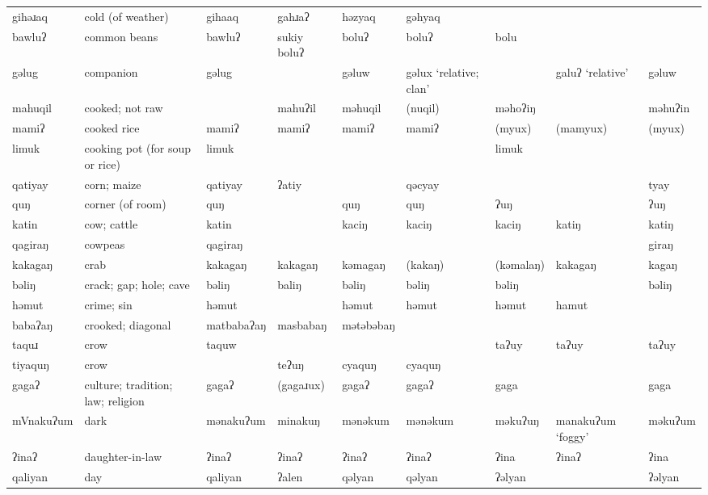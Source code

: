 \begin{landscape}
\begin{longtable}{*{9}{>{\raggedright\arraybackslash}p{}}}
\text{*}gihəɹaq      & cold (of weather) & gihaaq & gahɹaʔ & həzyaq & gəhyaq &  &  & \\
\text{*}bawluʔ       & common beans & bawluʔ & sukiy boluʔ & boluʔ & boluʔ & bolu &  & \\
\text{*}gəlug        & companion & gəlug &  & gəluw & gəlux `relative; clan' &  & galuʔ \newline `relative' & gəluw\\
\text{*}mahuqil      & cooked; not raw &  & mahuʔil & məhuqil & (nuqil) & məhoʔiŋ &  & məhuʔin\\
\text{*}mamiʔ        & cooked rice & mamiʔ & mamiʔ & mamiʔ & mamiʔ & (myux) & (mamyux) & (myux)\\
\text{*}limuk        & cooking pot (for soup or rice) & limuk &  &  &  & limuk &  & \\
\text{*}qatiyay      & corn; maize & qatiyay & ʔatiy &  & qəcyay &  &  & tyay\\
\text{*}quŋ          & corner (of room) & quŋ &  & quŋ & quŋ & ʔuŋ &  & ʔuŋ\\
\text{*}katin        & cow; cattle & katin &  & kaciŋ & kaciŋ & kaciŋ & katiŋ & katiŋ\\
\text{*}qagiraŋ      & cowpeas & qagiraŋ &  &  &  &  &  & giraŋ\\
\text{*}kakagaŋ      & crab & kakagaŋ & kakagaŋ & kəmagaŋ & (kakaŋ) & (kəmalaŋ) & kakagaŋ & kagaŋ\\
\text{*}bəliŋ        & crack; gap; hole; cave & bəliŋ & baliŋ & bəliŋ & bəliŋ & bəliŋ &  & bəliŋ\\
\text{*}həmut        & crime; sin & həmut &  & həmut & həmut & həmut & hamut & \\
\text{*}babaʔaŋ     & crooked; diagonal & matbabaʔaŋ & masbabaŋ & mətəbəbaŋ &  &  &  & \\
\text{*}taquɹ        & crow & taquw &  &  &  & taʔuy & taʔuy & taʔuy\\
\text{*}tiyaquŋ      & crow &  & teʔuŋ & cyaquŋ & cyaquŋ &  &  & \\
\text{*}gagaʔ        & culture; tradition; law; religion & gagaʔ & (gagaɹux) & gagaʔ & gagaʔ & gaga &  & gaga\\
\text{*}mVnakuʔum    & dark & mənakuʔum & minakuŋ & mənəkum & mənəkum & məkuʔuŋ & manakuʔum `foggy' & məkuʔum\\
\text{*}ʔinaʔ        & daughter-in-law & ʔinaʔ & ʔinaʔ & ʔinaʔ & ʔinaʔ & ʔina & ʔinaʔ & ʔina\\
\text{*}qaliyan      & day & qaliyan & ʔalen & qəlyan & qəlyan & ʔəlyan &  & ʔəlyan\\

\end{longtable}
\end{landscape}
